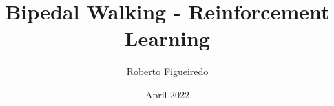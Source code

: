 \documentclass[12pt, a4paper]{article}
\title{Bipedal Walking - Reinforcement Learning}
\author{Roberto Figueiredo}
\date{April 2022}
\begin{document}
\begin{titlepage}
    \maketitle 
\end{titlepage}





\pagebreak
\tableofcontents
\pagebreak



\cite{relu}




\end{document}
